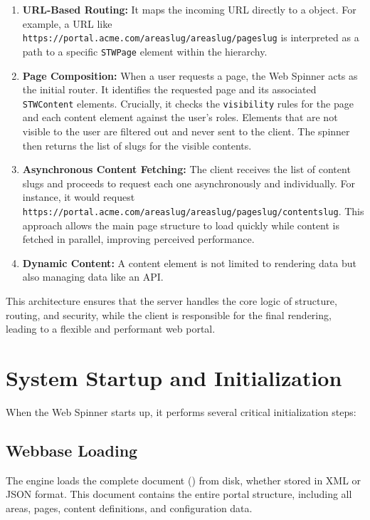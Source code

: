 \begin{enumerate}
    \item \textbf{URL-Based Routing:} It maps the incoming URL directly to a \webbase{} object. For example, a URL like \texttt{https://portal.acme.com/areaslug/areaslug/pageslug} is interpreted as a path to a specific \texttt{STWPage} element within the \webbase{} hierarchy.

    \item \textbf{Page Composition:} When a user requests a page, the Web Spinner acts as the initial router. It identifies the requested page and its associated \texttt{STWContent} elements. Crucially, it checks the \texttt{visibility} rules for the page and each content element against the user's roles. Elements that are not visible to the user are filtered out and never sent to the client. The spinner then returns the list of slugs for the visible contents.

    \item \textbf{Asynchronous Content Fetching:} The client receives the list of content slugs and proceeds to request each one asynchronously and individually. For instance, it would request \texttt{https://portal.acme.com/areaslug/areaslug/pageslug/contentslug}. This approach allows the main page structure to load quickly while content is fetched in parallel, improving perceived performance.

    \item \textbf{Dynamic Content:} A content element is not limited to rendering data but also managing data like an API.
\end{enumerate}

This architecture ensures that the server handles the core logic of structure, routing, and security, while the client is responsible for the final rendering, leading to a flexible and performant web portal.

\section{System Startup and Initialization}
\label{sec:system-startup}

When the Web Spinner starts up, it performs several critical initialization steps:

\subsection{Webbase Loading}

The engine loads the complete \wbdl{} document (\webbase{}) from disk, whether stored in XML or JSON format. This document contains the entire portal structure, including all areas, pages, content definitions, and configuration data.

